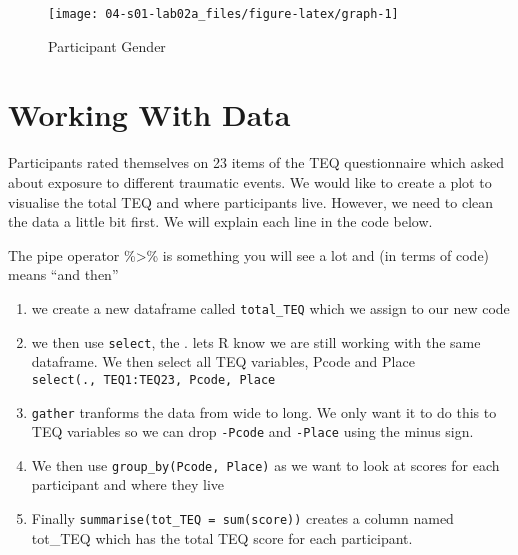 \documentclass[]{book}
\newenvironment{Shaded}{\begin{snugshade}}{\end{snugshade}}
\newcommand{\KeywordTok}[1]{\textcolor[rgb]{0.13,0.29,0.53}{\textbf{#1}}}
\newcommand{\DataTypeTok}[1]{\textcolor[rgb]{0.13,0.29,0.53}{#1}}
\newcommand{\StringTok}[1]{\textcolor[rgb]{0.31,0.60,0.02}{#1}}
\newcommand{\OperatorTok}[1]{\textcolor[rgb]{0.81,0.36,0.00}{\textbf{#1}}}
\newcommand{\NormalTok}[1]{#1}
\providecommand{\tightlist}{%
  \setlength{\itemsep}{0pt}\setlength{\parskip}{0pt}}
\begin{document}
\begin{figure}

{\centering \texttt{[image: 04-s01-lab02a\_files/figure-latex/graph-1]} 

}

\caption{Participant Gender}\label{fig:graph}
\end{figure}

\section{Working With Data}\label{working-with-data}

Participants rated themselves on 23 items of the TEQ questionnaire which
asked about exposure to different traumatic events. We would like to
create a plot to visualise the total TEQ and where participants live.
However, we need to clean the data a little bit first. We will explain
each line in the code below.

The pipe operator \%\textgreater{}\% is something you will see a lot and
(in terms of code) means ``and then''

\begin{enumerate}
\def\labelenumi{\arabic{enumi}.}
\tightlist
\item
  we create a new dataframe called \texttt{total\_TEQ} which we assign
  to our new code
\item
  we then use \texttt{select}, the . lets R know we are still working
  with the same dataframe. We then select all TEQ variables, Pcode and
  Place \texttt{select(.,\ TEQ1:TEQ23,\ Pcode,\ Place}
\item
  \texttt{gather} tranforms the data from wide to long. We only want it
  to do this to TEQ variables so we can drop \texttt{-Pcode} and
  \texttt{-Place} using the minus sign.
\item
  We then use \texttt{group\_by(Pcode,\ Place)} as we want to look at
  scores for each participant and where they live
\item
  Finally \texttt{summarise(tot\_TEQ\ =\ sum(score))} creates a column
  named tot\_TEQ which has the total TEQ score for each participant.
\end{enumerate}

\begin{Shaded}
\end{Shaded}
\end{document}
